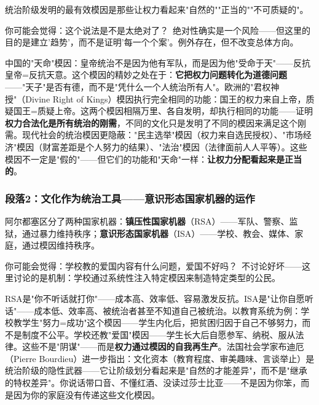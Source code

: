 \documentclass[../main.tex]{subfiles}
\begin{document}
	统治阶级发明的最有效模因是那些让权力看起来"自然的""正当的""不可质疑的"。

	\begin{tcolorbox}[colback=yellow!5, title=\textit{读者行为预测}]

		你可能会觉得：这个说法是不是太绝对了？\ 绝对性确实是一个风险——但这里的目的是建立'趋势'，而不是证明'每一个个案'。例外存在，但不改变总体方向。

	\end{tcolorbox}

中国的"天命"模因：皇帝统治不是因为他有军队，而是因为他"受命于天"——反抗皇帝=反抗天意。这个模因的精妙之处在于：\textbf{它把权力问题转化为道德问题}——"天子"是否有德，而不是"凭什么一个人统治所有人"。欧洲的"君权神授"（Divine Right of Kings）模因执行完全相同的功能：国王的权力来自上帝，质疑国王=质疑上帝。这两个模因相隔万里、各自发明，却执行相同的功能——证明\textbf{权力合法化是所有统治的刚需}，不同的文化只是发明了不同的模因来满足这个刚需。现代社会的统治模因更隐蔽："民主选举"模因（权力来自选民授权）、"市场经济"模因（财富差距是个人努力的结果）、"法治"模因（法律面前人人平等）。这些模因不一定是"假的"——但它们的功能和"天命"一样：\textbf{让权力分配看起来是正当的}。

	\subsubsection*{段落2：文化作为统治工具——意识形态国家机器的运作}

	阿尔都塞区分了两种国家机器：\textbf{镇压性国家机器}（RSA）——军队、警察、监狱，通过暴力维持秩序；\textbf{意识形态国家机器}（ISA）——学校、教会、媒体、家庭，通过模因维持秩序。

	\begin{tcolorbox}[colback=yellow!5, title=\textit{读者行为预测}]

		你可能会觉得：学校教的爱国内容有什么问题，爱国不好吗？\ 不讨论好坏——这里讨论的是机制：学校通过系统性注入特定模因来制造特定类型的公民。

	\end{tcolorbox}

RSA是"你不听话就打你"——成本高、效率低、容易激发反抗。ISA是"让你自愿听话"——成本低、效率高、被统治者甚至不知道自己被统治。以教育系统为例：学校教学生"努力=成功"这个模因——学生内化后，把贫困归因于自己不够努力，而不是制度不公平。学校还教"爱国"模因——学生长大后自愿参军、纳税、服从法律。这些不是"阴谋"——而是\textbf{权力通过模因的自我再生产}。法国社会学家布迪厄（Pierre Bourdieu）进一步指出：文化资本（教育程度、审美趣味、言谈举止）是统治阶级的隐性武器——它让阶级划分看起来是"自然的才能差异"，而不是"继承的特权差异"。你说话带口音、不懂红酒、没读过莎士比亚——不是因为你笨，而是因为你的家庭没有传递这些文化模因。
\end{document}

